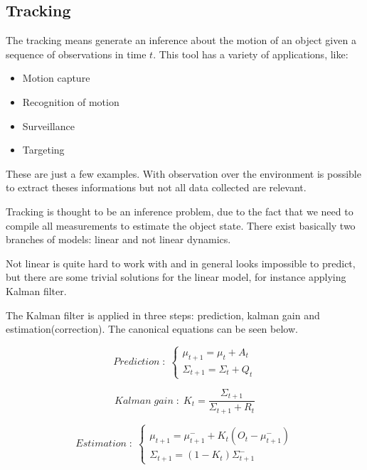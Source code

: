 \documentclass{article}
\begin{document}
\subsection{Tracking}

The tracking means generate an inference about the motion of an object given a sequence of observations in time $t$. This tool has a variety of applications, like:

\begin{itemize}
\item Motion capture
\item Recognition of motion
\item Surveillance
\item Targeting
\end{itemize}

These are just a few examples. With observation over the environment is possible to extract theses informations but not all data collected are relevant. 

Tracking is thought to be an inference problem, due to the fact that we need to compile all measurements to estimate the object state. There exist basically two branches of models: linear and not linear dynamics.

Not linear is quite hard to work with and in general looks impossible to predict, but there are some trivial solutions for the  linear model, for instance applying Kalman filter.

The Kalman filter is applied in three steps: prediction, kalman gain and estimation(correction). The canonical equations can be seen below.

\begin{equation} \label{eq:prediction}
  Prediction\;:\; 
  \left\{ 
    \begin{array}{ c }
      \mu_{t+1} = \mu_t + A_t \\
      \Sigma_{t+1} = \Sigma_t + Q_t
    \end{array}
  \right.
\end{equation}

\begin{equation} \label{eq:kalman_gain}
  Kalman\;gain\;:\; K_t = \frac{\Sigma_{t+1}}{\Sigma_{t+1} + R_t}
\end{equation}

\begin{equation} \label{eq:estimation}
  Estimation\;:\; 
  \left\{ 
    \begin{array}{ c }
      \mu_{t+1} = \mu^{-}_{t+1} + K_t(O_t - \mu^{-}_{t+1}) \\
      \Sigma_{t+1} = (1 - K_t)\Sigma^{-}_{t+1}
    \end{array}
  \right.
\end{equation}
\end{document}
